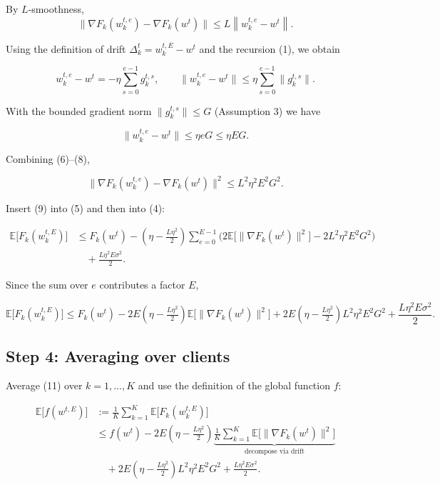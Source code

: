 \documentclass{article}
\newcommand{\E}{\mathbb{E}}
\newcommand{\norm}[1]{\left\|#1\right\|}
\begin{document}
By $L$‑smoothness,
\[
\|\nabla F_k(w^{t,e}_{k})-\nabla F_k(w^{t})\|
\le L\norm{w^{t,e}_{k}-w^{t}}.
\tag{6}
\]

Using the definition of drift $\Delta^{t}_{k}=w^{t,E}_{k}-w^{t}$ and the recursion (1), we obtain

\[
w^{t,e}_{k}-w^{t}= -\eta\sum_{s=0}^{e-1} g^{t,s}_{k},
\qquad
\|\!w^{t,e}_{k}-w^{t}\!\|\le \eta\sum_{s=0}^{e-1}\|g^{t,s}_{k}\|.
\tag{7}
\]

With the bounded gradient norm $\|g^{t,s}_{k}\|\le G$ (Assumption 3) we have  

\[
\|\!w^{t,e}_{k}-w^{t}\!\|\le \eta e G\le \eta EG .
\tag{8}
\]

Combining (6)–(8),

\[
\|\nabla F_k(w^{t,e}_{k})-\nabla F_k(w^{t})\|^{2}\le L^{2}\eta^{2}E^{2}G^{2}.
\tag{9}
\]

Insert (9) into (5) and then into (4):

\[
\begin{aligned}
\E\big[F_k(w^{t,E}_{k})\big]
&\le
F_k(w^{t})-(\eta-\tfrac{L\eta^{2}}{2})\sum_{e=0}^{E-1}\Big(2\E\!\big[\|\nabla F_k(w^{t})\|^{2}\big]
-2L^{2}\eta^{2}E^{2}G^{2}\Big)\\
&\quad+\frac{L\eta^{2}E\sigma^{2}}{2}.
\end{aligned}
\tag{10}
\]

Since the sum over $e$ contributes a factor $E$,

\[
\E\big[F_k(w^{t,E}_{k})\big]\le
F_k(w^{t})-2E(\eta-\tfrac{L\eta^{2}}{2})\E\!\big[\|\nabla F_k(w^{t})\|^{2}\big]
+2E(\eta-\tfrac{L\eta^{2}}{2})L^{2}\eta^{2}E^{2}G^{2}
+\frac{L\eta^{2}E\sigma^{2}}{2}.
\tag{11}
\]

\subsection*{Step 4: Averaging over clients}
Average (11) over $k=1,\dots,K$ and use the definition of the global function $f$:

\[
\begin{aligned}
\E\big[f(w^{t,E})\big]
&:=\frac{1}{K}\sum_{k=1}^{K}\E\big[F_k(w^{t,E}_{k})\big] \\
&\le f(w^{t})-2E(\eta-\tfrac{L\eta^{2}}{2})\underbrace{\frac{1}{K}\sum_{k=1}^{K}\E\!\big[\|\nabla F_k(w^{t})\|^{2}\big]}_{\text{decompose via drift}}\\
&\quad+2E(\eta-\tfrac{L\eta^{2}}{2})L^{2}\eta^{2}E^{2}G^{2}
+\frac{L\eta^{2}E\sigma^{2}}{2}.
\end{aligned}
\tag{12}
\]
\end{document}

